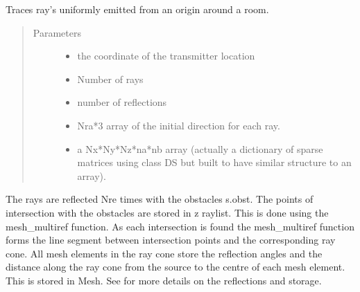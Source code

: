 \documentclass[letterpaper,10pt,english]{sphinxmanual}
\begin{document}
\begin{fulllineitems}
\begin{fulllineitems}
\label{\detokenize{index:Room.room.ray_mesh_bounce}}
Traces ray’s uniformly emitted from an origin around a room.
\begin{quote}\begin{description}
\item[{Parameters}] \leavevmode\begin{itemize}
\item {} 
 \textendash{} the co\sphinxhyphen{}ordinate of the transmitter location

\item {} 
 \textendash{} Number of rays

\item {} 
 \textendash{} number of reflections

\item {} 
 \textendash{} Nra*3 array of the initial direction for     each ray.

\item {} 
 \textendash{} a Nx*Ny*Nz*na*nb array (actually a dictionary of     sparse matrices using class DS but built to have similar     structure to an array).

\end{itemize}

\end{description}\end{quote}

\begin{sphinxVerbatim}[commandchars=\\\{\}]
 
\end{sphinxVerbatim}

The rays are reflected Nre times with the obstacles s.obst.     The points of intersection with the obstacles are stored in z
raylist. This is done using the mesh\_multiref function.
As each intersection is found the mesh\_multiref function     forms the line segment between intersection points and the     corresponding ray cone. All mesh elements in the ray cone store     the reflection angles and the distance along the ray cone from the     source to the centre of each mesh element. This is stored in Mesh.
See  for more details on the     reflections and storage.


\end{fulllineitems}
\end{fulllineitems}
\end{document}
